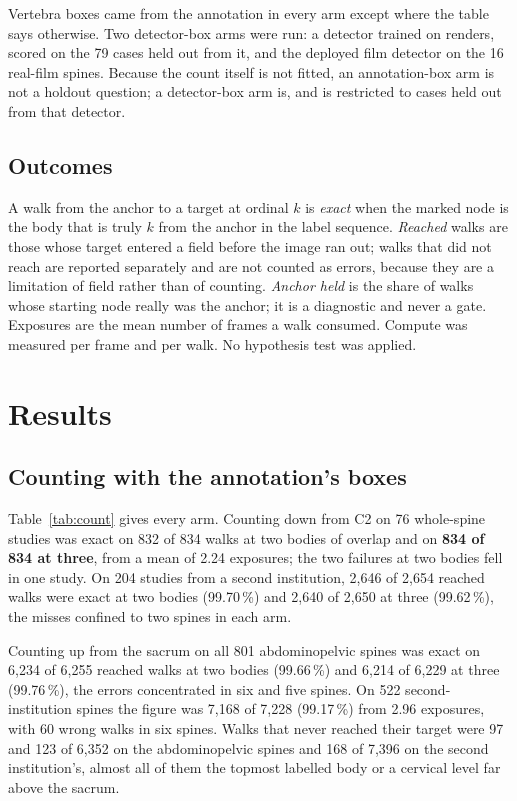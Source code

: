 \documentclass[11pt,letterpaper]{article}
\newcommand{\pc}[1]{#1\,\%}
\begin{document}
Vertebra boxes came from the annotation in every arm except where the table says otherwise. Two
detector-box arms were run: a detector trained on renders, scored on the 79 cases held out from it, and the
deployed film detector on the 16 real-film spines. Because the count itself is not fitted, an
annotation-box arm is not a holdout question; a detector-box arm is, and is restricted to cases held out
from that detector.

\subsection*{Outcomes}

A walk from the anchor to a target at ordinal $k$ is \emph{exact} when the marked node is the body that is
truly $k$ from the anchor in the label sequence. \emph{Reached} walks are those whose target entered a
field before the image ran out; walks that did not reach are reported separately and are not counted as
errors, because they are a limitation of field rather than of counting. \emph{Anchor held} is the share of
walks whose starting node really was the anchor; it is a diagnostic and never a gate. Exposures are the
mean number of frames a walk consumed. Compute was measured per frame and per walk.
No hypothesis test was applied.

\section*{Results}

\subsection*{Counting with the annotation's boxes}

Table~\ref{tab:count} gives every arm. Counting down from C2 on 76 whole-spine studies was exact on 832 of
834 walks at two bodies of overlap and on \textbf{834 of 834 at three}, from a mean of 2.24 exposures; the
two failures at two bodies fell in one study. On 204 studies from a second institution, 2,646 of 2,654
reached walks were exact at two bodies (\pc{99.70}) and 2,640 of 2,650 at three (\pc{99.62}), the misses
confined to two spines in each arm.

Counting up from the sacrum on all 801 abdominopelvic spines was exact on 6,234 of 6,255 reached walks at
two bodies (\pc{99.66}) and 6,214 of 6,229 at three (\pc{99.76}), the errors concentrated in six and five
spines. On 522 second-institution spines the figure was 7,168 of 7,228 (\pc{99.17}) from 2.96 exposures,
with 60 wrong walks in six spines. Walks that never reached their target were 97 and 123 of 6,352 on the
abdominopelvic spines and 168 of 7,396 on the second institution's, almost all of them the topmost labelled
body or a cervical level far above the sacrum.
\end{document}
